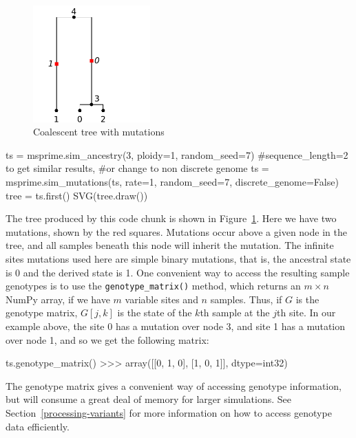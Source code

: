 \documentclass[graybox]{svmult}
\begin{document}
\begin{figure}[t]
\begin{center}
\includegraphics[width=0.4\textwidth]{images/plot_2.pdf}
\end{center}
\caption{\label{fig-tree-mutations} Coalescent tree with mutations}
\end{figure}

\begin{pythoncode}
ts = msprime.sim_ancestry(3, ploidy=1, random_seed=7)
#sequence_length=2 to get similar results,
#or change to non discrete genome
ts = msprime.sim_mutations(ts, rate=1, random_seed=7,
                           discrete_genome=False)
tree = ts.first()
SVG(tree.draw())
\end{pythoncode}

The tree produced by this code chunk is shown in
Figure~\ref{fig-tree-mutations}. Here we have two mutations, shown by the red squares.
Mutations occur above a given node in the tree, and all samples beneath
this node will inherit the mutation. The infinite sites mutations used
here are simple binary mutations, that is, the ancestral state is 0 and
the derived state is 1. One convenient way to access the resulting
sample genotypes is to use the \texttt{genotype\_matrix()} method, which
returns an \(m \times n\) NumPy array, if we have \(m\) variable sites
and \(n\) samples. Thus, if \(G\) is the genotype matrix, \(G[j, k]\) is
the state of the \(k\)th sample at the \(j\)th site. In our example
above, the site 0 has a mutation over node 3, and site 1 has a mutation
over node 1, and so we get the following matrix:

\begin{pythoncode}
ts.genotype_matrix()
>>> array([[0, 1, 0],
           [1, 0, 1]], dtype=int32)
\end{pythoncode}

    The genotype matrix gives a convenient way of accessing genotype
information, but will consume a great deal of memory for larger
simulations. See Section~\ref{processing-variants} for more information
on how to access genotype data efficiently.
\end{document}
